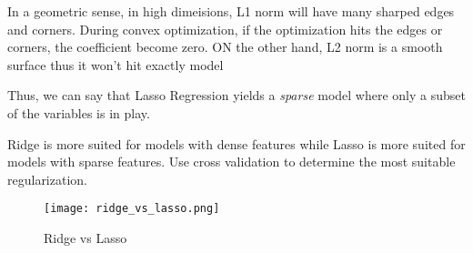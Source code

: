 \documentclass{article}
\begin{document}
\begin{enumerate}
    In a geometric sense, in high dimeisions, L1 norm will have many sharped edges and corners. During convex optimization, if the optimization hits the edges or corners, the coefficient become zero.  ON the other hand, L2 norm is a smooth surface thus it won't hit exactly model
    
    Thus, we can say that Lasso Regression yields a \emph{sparse} model where only a subset of the variables is in play. 
    
    Ridge is more suited for models with dense features while Lasso is more suited for models with sparse features. Use cross validation to determine the most suitable regularization.
    
    
\begin{figure}
  \texttt{[image: ridge\_vs\_lasso.png]}
  \caption{Ridge vs Lasso}
  \label{fig:ridge_vs_lasso}
\end{figure}
    
\end{enumerate}
\end{document}
